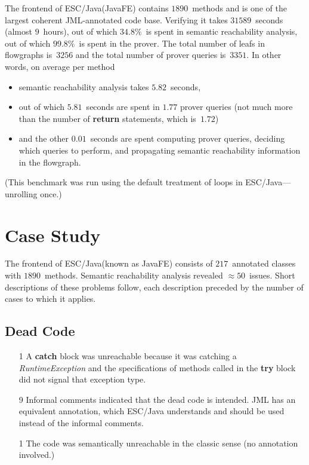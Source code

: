 \documentclass[a4paper]{article}
\newcommand{\escjava}{ESC\slash Java\xspace}
\theoremstyle{slanted}
\theoremstyle{definition}
\theoremstyle{remark}
\begin{document}
The frontend of \escjava (JavaFE) contains $1890$~methods and is
one of the largest coherent JML-annotated code base. Verifying
it takes $31589$~seconds (almost $9$~hours), out of which
$34.8\%$~is spent in semantic reachability analysis, out of
which $99.8\%$~is spent in the prover. The total number of leafs
in flowgraphs is~$3256$ and the total number of prover queries
is~$3351$. In other words, on average per method
\begin{itemize}
\item 
  semantic reachability analysis takes $5.82$~seconds,
\item 
  out of which $5.81$~seconds are spent in $1.77$ prover queries
  (not much more than the number of \textbf{return} statements, which
  is~$1.72$)
\item
  and the other $0.01$~seconds are spent computing prover
  queries, deciding which queries to perform, and propagating
  semantic reachability information in the flowgraph.
\end{itemize}
(This benchmark was run using the default treatment of loops in
\escjava---unrolling once.)
\section{Case Study}
\label{sec:ra.case_study}

The frontend of \escjava (known as JavaFE) consists of
$217$~annotated classes with $1890$~methods. Semantic
reachability analysis revealed $\approx50$~issues. Short
descriptions of these problems follow, each description preceded
by the number of cases to which it applies.

\subsection{Dead Code}

\begin{itemize}
\item[1] 
  A \textbf{catch} block was unreachable because it was catching
  a \textit{RuntimeException} and the specifications of methods
  called in the \textbf{try} block did not signal that exception type.
\item[9]
  Informal comments indicated that the dead code is intended.
  JML has an equivalent annotation, which \escjava understands
  and should be used instead of the informal comments.
\item[1]
  The code was semantically unreachable in the classic sense (no
  annotation involved.)
\end{itemize}
\end{document}
